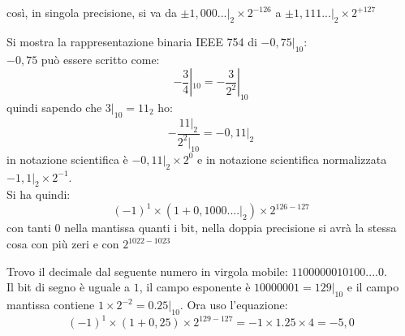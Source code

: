 \documentclass[a4paper,12pt, oneside]{book}
\begin{document}
\begin{enumerate}
così, in singola precisione, si va da $\pm 1,000...|_2\times 2^{-126}$ a $\pm 1,111...|_2\times 2^{+127}$
\begin{esempio}
Si mostra la rappresentazione binaria IEEE 754 di $-0,75|_{10}$:\\
$-0,75$ può essere scritto come: 
$$-\frac{3}{4}|_{10}=-\frac{3}{2^2}|_{10}$$
quindi sapendo che $3|_{10}=11_{2}$ ho:
$$-\frac{11|_2}{2^2|_{10}}=-0,11|_2$$
in notazione scientifica è $-0,11|_2\times 2^0$ e in notazione scientifica normalizzata $-1,1|_{2}\times 2^{-1}$.\\ Si ha quindi:
$$(-1)^1\times (1+0,1000....|_2)\times 2^{126-127}$$
con tanti 0 nella mantissa quanti i bit, nella doppia precisione si avrà la stessa cosa con più zeri e con $2^{1022-1023}$
\end{esempio}
\begin{esempio}
Trovo il decimale dal seguente numero in virgola mobile: $1100000010100....0$.\\ Il bit di segno è uguale a $1$, il campo esponente è $10000001=129|_{10}$ e il campo mantissa contiene $1\times 2^{-2}=0.25|_{10}$. Ora uso l'equazione:
$$(-1)^1\times (1+0,25)\times 2^{129-127}= -1\times 1.25\times 4=-5,0$$
\end{esempio}
\end{enumerate}
\end{document}
